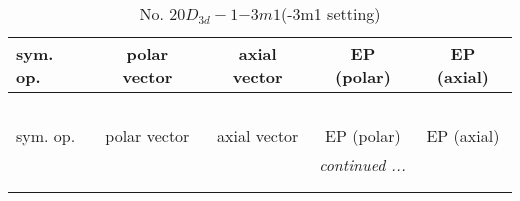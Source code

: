 \documentclass[fleqn,10pt,landscape]{jsarticle}
\begin{document}
\newpage
\begin{center}
\renewcommand{\arraystretch}{1.3}
\begin{longtable}{lcccc}
\caption{No. 20\quad$D_{3d}-1$\quad$-3m1$\quad(-3m1 setting)\quad[ trigonal ]}
 \\
 \hline \hline
sym. op. & polar vector & axial vector & EP (polar) & EP (axial) \\ \hline \endfirsthead

\multicolumn{4}{l}{\tablename\ \thetable{}} \\
 \hline \hline
sym. op. & polar vector & axial vector & EP (polar) & EP (axial) \\ \hline \endhead

 \hline \hline
\multicolumn{4}{r}{\footnotesize\it continued ...} \\ \endfoot

 \hline \hline
\multicolumn{4}{r}{} \\ \endlastfoot


\end{longtable}
\end{center}
\end{document}
